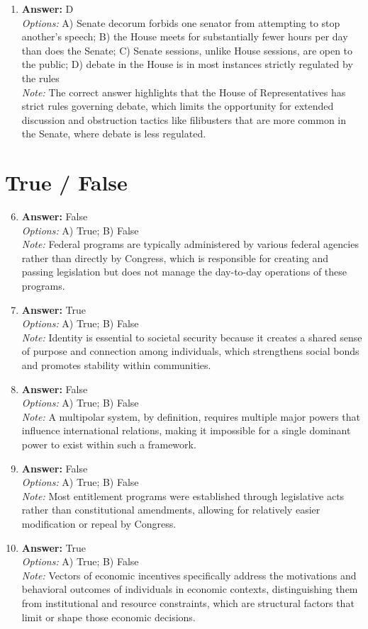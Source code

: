\documentclass[12pt]{article}
\begin{document}
\begin{enumerate}[label=\arabic*.]
\item \textbf{Answer:} D
\\ \textit{Options:} A) Senate decorum forbids one senator from attempting to stop another's speech; B) the House meets for substantially fewer hours per day than does the Senate; C) Senate sessions, unlike House sessions, are open to the public; D) debate in the House is in most instances strictly regulated by the rules
\\ \textit{Note:} The correct answer highlights that the House of Representatives has strict rules governing debate, which limits the opportunity for extended discussion and obstruction tactics like filibusters that are more common in the Senate, where debate is less regulated.
\end{enumerate}

\section*{True / False}
\begin{enumerate}[label=\arabic*.]
\setcounter{enumi}{5}
\item \textbf{Answer:} False
\\ \textit{Options:} A) True; B) False
\\ \textit{Note:} Federal programs are typically administered by various federal agencies rather than directly by Congress, which is responsible for creating and passing legislation but does not manage the day-to-day operations of these programs.
\item \textbf{Answer:} True
\\ \textit{Options:} A) True; B) False
\\ \textit{Note:} Identity is essential to societal security because it creates a shared sense of purpose and connection among individuals, which strengthens social bonds and promotes stability within communities.
\item \textbf{Answer:} False
\\ \textit{Options:} A) True; B) False
\\ \textit{Note:} A multipolar system, by definition, requires multiple major powers that influence international relations, making it impossible for a single dominant power to exist within such a framework.
\item \textbf{Answer:} False
\\ \textit{Options:} A) True; B) False
\\ \textit{Note:} Most entitlement programs were established through legislative acts rather than constitutional amendments, allowing for relatively easier modification or repeal by Congress.
\item \textbf{Answer:} True
\\ \textit{Options:} A) True; B) False
\\ \textit{Note:} Vectors of economic incentives specifically address the motivations and behavioral outcomes of individuals in economic contexts, distinguishing them from institutional and resource constraints, which are structural factors that limit or shape those economic decisions.
\end{enumerate}
\end{document}
